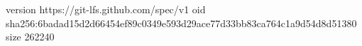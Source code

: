 version https://git-lfs.github.com/spec/v1
oid sha256:6badad15d2d66454ef89c0349e593d29ace77d33bb83ca764c1a9d54d8d51380
size 262240
